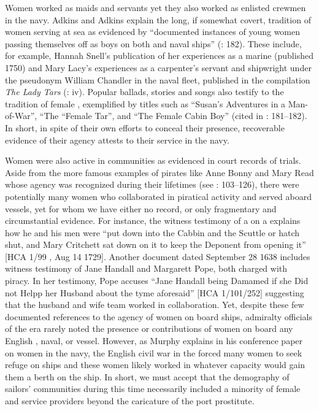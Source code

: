   Women worked as maids and servants yet they also worked as enlisted crewmen in the navy. Adkins and Adkins explain the long, if somewhat covert, tradition of women serving at sea as evidenced by “documented instances of young women passing themselves off as boys on both  and naval ships” (\citealt{AdkinsAdkins2008}: 182). These include, for example, Hannah Snell’s publication of her experiences as a marine (published 1750) and Mary Lacy’s experiences as a carpenter’s servant and shipwright under the pseudonym William Chandler in the naval fleet, published in the compilation \textit{The Lady Tars} (\citealt{SnellEtAl2008}: iv). Popular ballads, stories and songs also testify to the tradition of female , exemplified by titles such as “Susan’s Adventures in a Man-of-War”, “The “Female Tar”, and “The Female Cabin Boy” (cited in \citealt{AdkinsAdkins2008}: 181–182). In short, in spite of their own efforts to conceal their presence, recoverable evidence of their agency attests to their service in the navy. 

Women were also active in  communities as evidenced in court records of trials. Aside from the more famous examples of pirates like Anne Bonny and Mary Read whose agency was recognized during their lifetimes (see \citealt{Rediker2004}: 103–126), there were potentially many women who collaborated in piratical activity and served aboard  vessels, yet for whom we have either no record, or only fragmentary and circumstantial evidence. For instance, the witness testimony of a  on a  explains how he and his men were “put down into the Cabbin and the Scuttle or hatch shut, and Mary Critchett sat down on it to keep the Deponent from opening it” [HCA 1/99 , Aug 14 1729]. Another document dated September 28 1638 includes witness testimony of Jane Handall and Margarett Pope, both charged with piracy. In her testimony, Pope accuses “Jane Handall being Damamed if she Did not Helpp her Husband about the tyme aforesaid” [HCA 1/101/252] suggesting that the husband and wife team worked in collaboration. Yet, despite these few documented references to the agency of women on board  ships, admiralty officials of the era rarely noted the presence or contributions of women on board any English , naval, or  vessel. However, as Murphy explains in his \citeyear*{Murphy2015} conference paper on women in the navy, the English civil war in the  forced many women to seek refuge on ships and these women likely worked in whatever capacity would gain them a berth on the ship. In short, we must accept that the demography of sailors’ communities during this time necessarily included a minority of female  and service providers beyond the caricature of the port prostitute. 



